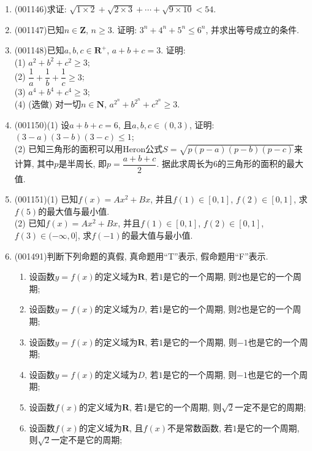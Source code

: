 \documentclass[10pt,a4paper]{article}
\newcommand{\blank}[1]{\underline{\hbox to #1pt{}}}
\begin{document}
\begin{enumerate}[1.]
\item {\tiny (001146)}求证: $\sqrt{1\times2}+\sqrt{2\times3}+\cdots+\sqrt{9\times10}<54$.
\item {\tiny (001147)}已知$n\in\mathbf{Z}$, $n \ge 3$. 证明: $3^n+4^n+5^n\le 6^n$, 并求出等号成立的条件.
\item {\tiny (001148)}已知$a,b,c\in \mathbf{R}^+$, $a+b+c=3$. 证明:\\ 
(1) $a^2+b^2+c^2\ge 3$;\\ 
(2) $\dfrac1a+\dfrac1b+\dfrac1c\ge 3$;\\ 
(3) $a^4+b^4+c^4\ge 3$;\\ 
(4) (选做) 对一切$n\in \mathbf{N}$, $a^{2^n}+b^{2^n}+c^{2^n}\ge 3$.
\item {\tiny (001150)}(1) 设$a+b+c=6$, 且$a,b,c\in(0,3)$, 证明: $(3-a)(3-b)(3-c)\le 1$;\\ 
(2) 已知三角形的面积可以用Heron公式$S=\sqrt{p(p-a)(p-b)(p-c)}$来计算, 其中$p$是半周长, 即$p=\dfrac{a+b+c}{2}$. 据此求周长为$6$的三角形的面积的最大值.
\item {\tiny (001151)}(1) 已知$f(x)=Ax^2+Bx$, 并且$f(1)\in [0,1]$, $f(2)\in [0,1]$, 求$f(5)$的最大值与最小值.\\ 
(2) 已知$f(x)=Ax^2+Bx$, 并且$f(1)\in [0,1]$, $f(2)\in [0,1]$, $f(3)\in (-\infty,0]$, 求$f(-1)$的最大值与最小值.
\item {\tiny (001491)}判断下列命题的真假, 真命题用``{\rm T}''表示, 假命题用``{\rm F}''表示.\\ 
\begin{enumerate}[\blank{30}(1)]
\item 设函数$y=f(x)$的定义域为$\mathbf{R}$, 若$1$是它的一个周期, 则$2$也是它的一个周期;\\ 
\item 设函数$y=f(x)$的定义域为$D$, 若$1$是它的一个周期, 则$2$也是它的一个周期;\\ 
\item 设函数$y=f(x)$的定义域为$\mathbf{R}$, 若$1$是它的一个周期, 则$-1$也是它的一个周期;\\ 
\item 设函数$y=f(x)$的定义域为$D$, 若$1$是它的一个周期, 则$-1$也是它的一个周期;\\ 
\item 设函数$f(x)$的定义域为$\mathbf{R}$, 若$1$是它的一个周期, 则$\sqrt{2}$一定不是它的周期;\\ 
\item 设函数$f(x)$的定义域为$\mathbf{R}$, 且$f(x)$不是常数函数, 若$1$是它的一个周期, 则$\sqrt{2}$一定不是它的周期;\\ 

\end{enumerate}
\end{enumerate}
\end{document}
